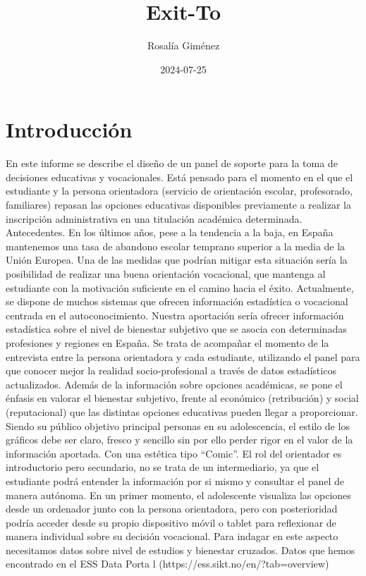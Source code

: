 \documentclass{report}
\title{Exit-To}
\author{Rosalía Giménez}
\date{2024-07-25}
\begin{document}


\maketitle

\tableofcontents

\section*{Introducción}
\normalsize
\begin{multicols}{2}
En este informe se describe el diseño de un panel de soporte para la toma de decisiones educativas
y vocacionales. Está pensado para el momento en el que el estudiante y la persona orientadora
(servicio de orientación escolar, profesorado, familiares) repasan las opciones educativas
disponibles previamente a realizar la inscripción administrativa en una titulación académica
determinada.
Antecedentes.
En los últimos años, pese a la tendencia a la baja, en
España mantenemos una tasa de abandono escolar
temprano superior a la media de la Unión Europea.
Una de las medidas que podrían mitigar esta situación
sería la posibilidad de realizar una buena orientación
vocacional, que mantenga al estudiante con la
motivación suficiente en el camino hacia el éxito.
Actualmente, se dispone de muchos sistemas que ofrecen información estadística o vocacional
centrada en el autoconocimiento. Nuestra aportación sería ofrecer información estadística sobre el
nivel de bienestar subjetivo que se asocia con determinadas profesiones y regiones en España.
Se trata de acompañar el momento de la entrevista entre la persona orientadora y cada estudiante,
utilizando el panel para que conocer mejor la realidad socio-profesional a través de datos
estadísticos actualizados.
Además de la información sobre opciones académicas, se pone el énfasis en valorar el bienestar
subjetivo, frente al económico (retribución) y social (reputacional) que las distintas opciones
educativas pueden llegar a proporcionar.
Siendo su público objetivo principal personas en su adolescencia, el estilo de los gráficos debe ser
claro, fresco y sencillo sin por ello perder rigor en el valor de la información aportada. Con una
estética tipo “Comic”.
El rol del orientador es introductorio pero secundario, no se trata de un intermediario, ya que el
estudiante podrá entender la información por si mismo y consultar el panel de manera autónoma.
En un primer momento, el adolescente visualiza las opciones desde un ordenador junto con la
persona orientadora, pero con posterioridad podría acceder desde su propio dispositivo móvil o
tablet para reflexionar de manera individual sobre su decisión vocacional.
Para indagar en este aspecto necesitamos datos sobre nivel de estudios y bienestar cruzados.
Datos que hemos encontrado en el ESS Data Porta l (https://ess.sikt.no/en/?tab=overview)
\end{multicols}
\end{document}
